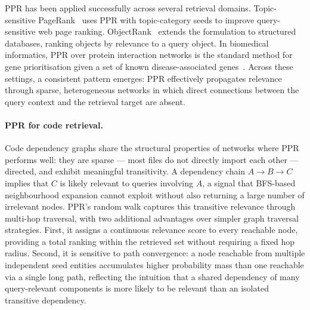 PPR has been applied successfully across several retrieval domains.
Topic-sensitive PageRank~\cite{haveliwala2002ppr} uses PPR with topic-category seeds
to improve query-sensitive web page ranking.
ObjectRank~\cite{balmin2004objectrank} extends the formulation to structured databases,
ranking objects by relevance to a query object.
In biomedical informatics, PPR over protein interaction networks is the standard method
for gene prioritisation given a set of known disease-associated genes~\cite{kohler2008disease}.
Across these settings, a consistent pattern emerges: PPR effectively propagates relevance
through sparse, heterogeneous networks in which direct connections between the query
context and the retrieval target are absent.

\paragraph{PPR for code retrieval.}
Code dependency graphs share the structural properties of networks where PPR performs well:
they are sparse — most files do not directly import each other — directed, and exhibit
meaningful transitivity.
A dependency chain $A \to B \to C$ implies that $C$ is likely relevant to queries
involving $A$, a signal that BFS-based neighbourhood expansion cannot exploit without
also returning a large number of irrelevant nodes.
PPR's random walk captures this transitive relevance through multi-hop traversal,
with two additional advantages over simpler graph traversal strategies.
First, it assigns a continuous relevance score to every reachable node, providing a
total ranking within the retrieved set without requiring a fixed hop radius.
Second, it is sensitive to path convergence: a node reachable from multiple independent
seed entities accumulates higher probability mass than one reachable via a single long
path, reflecting the intuition that a shared dependency of many query-relevant components
is more likely to be relevant than an isolated transitive dependency.

